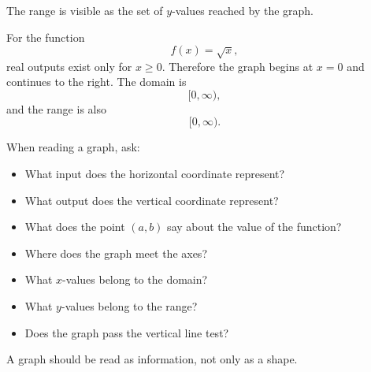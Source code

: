 The range is visible as the set of \(y\)-values reached by the graph.

\begin{examplebox}
For the function
\[
f(x)=\sqrt{x},
\]
real outputs exist only for \(x\ge0\). Therefore the graph begins at \(x=0\) and continues to the right. The domain is
\[
[0,\infty),
\]
and the range is also
\[
[0,\infty).
\]
\end{examplebox}

\begin{summarybox}
When reading a graph, ask:
\begin{itemize}
\item What input does the horizontal coordinate represent?
\item What output does the vertical coordinate represent?
\item What does the point \((a,b)\) say about the value of the function?
\item Where does the graph meet the axes?
\item What \(x\)-values belong to the domain?
\item What \(y\)-values belong to the range?
\item Does the graph pass the vertical line test?
\end{itemize}
\end{summarybox}

A graph should be read as information, not only as a shape.